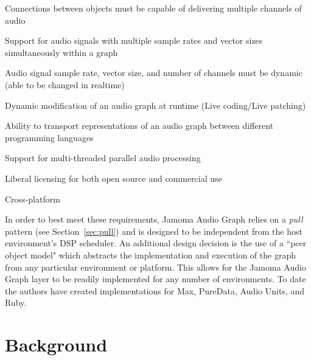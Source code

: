 \documentclass[twoside,a4paper]{article}
\newenvironment{packed_item}{
\begin{itemize}
  \setlength{\itemsep}{1pt}
  \setlength{\parskip}{0pt}
  \setlength{\parsep}{0pt}
}{\end{itemize}}
\begin{document}
\begin{packed_item}
	\item{Connections between objects must be capable of delivering multiple channels of audio}
	\item{Support for audio signals with multiple sample rates and vector sizes simultaneously within a graph}
	\item{Audio signal sample rate, vector size, and number of channels must be dynamic (able to be changed in realtime)}
	\item{Dynamic modification of an audio graph at runtime (Live coding/Live patching)}    
	\item{Ability to transport representations of an audio graph between different programming languages}
	\item{Support for multi-threaded parallel audio processing}
	\item{Liberal licensing for both open source and commercial use}
	\item{Cross-platform}
\end{packed_item}	

In order to best meet these requirements, Jamoma Audio Graph relies on a \emph{pull} pattern (see Section~\ref{sec:pull}) and is designed to be independent from the host environment's DSP scheduler.
An additional design decision is the use of a ``peer object model" which abstracts the implementation and execution of the graph from any particular environment or platform.  
This allows for the Jamoma Audio Graph layer to be readily implemented for any number of environments.
To date the authors have created implementations for Max, PureData, Audio Units, and Ruby.





%
\section{Background} %
%
\end{document}
